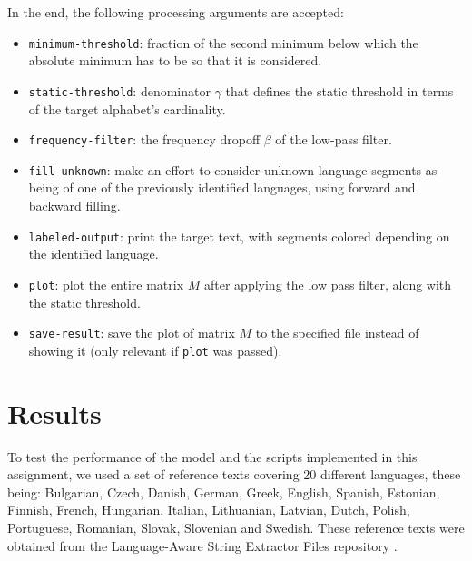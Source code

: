 \documentclass{article}
\begin{document}
In the end, the following processing arguments are accepted:
\begin{itemize}
    \item \texttt{minimum-threshold}: fraction of the second minimum below which the absolute minimum has to be so that it is considered.
    \item \texttt{static-threshold}: denominator $\gamma$ that defines the static threshold in terms of the target alphabet's cardinality.
    \item \texttt{frequency-filter}: the frequency dropoff $\beta$ of the low-pass filter.
    \item \texttt{fill-unknown}: make an effort to consider unknown language segments as being of one of the previously identified languages, using forward and backward filling.
    \item \texttt{labeled-output}: print the target text, with segments colored depending on the identified language.
    \item \texttt{plot}: plot the entire matrix $M$ after applying the low pass filter, along with the static threshold.
    \item \texttt{save-result}: save the plot of matrix $M$ to the specified file instead of showing it (only relevant if \texttt{plot} was passed).
\end{itemize}

\section{Results}
\label{sec:results}


To test the performance of the model and the scripts implemented in this assignment, we used a set of reference texts covering 20 different languages,
these being: Bulgarian, Czech, Danish, German, Greek, English, Spanish, Estonian, Finnish, French, Hungarian, Italian, Lithuanian, Latvian, Dutch, Polish, Portuguese, Romanian, Slovak, Slovenian and Swedish.
These reference texts were obtained from the Language-Aware String Extractor Files repository \cite{references:source}.
\end{document}

